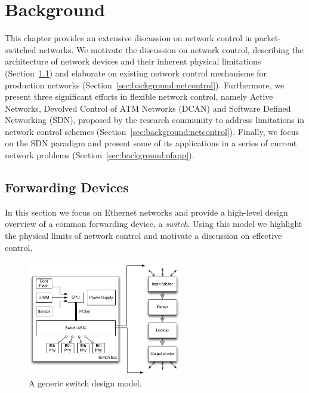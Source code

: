 \chapter{Background} \label{ch:background}

This chapter provides an extensive discussion on network control in
packet-switched networks.  We motivate the discussion on network control,
describing the architecture of network devices and their inherent physical
limitations (Section~\ref{sec:background:forwarding}) and elaborate on existing
network control mechanisms for production networks
(Section~\ref{sec:background:netcontrol}).  Furthermore, we present three
significant efforts in flexible network control, namely Active Networks,
Devolved Control of ATM Networks (DCAN) and Software Defined Networking (SDN),
proposed by the research community to address limitations in network control
schemes (Section~\ref{sec:background:netcontrol}). Finally, we focus on the SDN
paradigm and present some of its applications in a series of current network
problems (Section~\ref{sec:background:ofapp}).

\section{Forwarding Devices} \label{sec:background:forwarding}

In this section we focus on Ethernet networks and provide a high-level design
overview of a common forwarding device, a \emph{switch}. Using this model we
highlight the physical limits of network control and motivate a discussion on
effective control. 


\begin{figure}
  \centering
\includegraphics[width=0.6\textwidth]{Background/BackgroundFigs/switch_design}
\caption{A generic switch design model.}
\label{fig:background:switch_design}
\end{figure}

